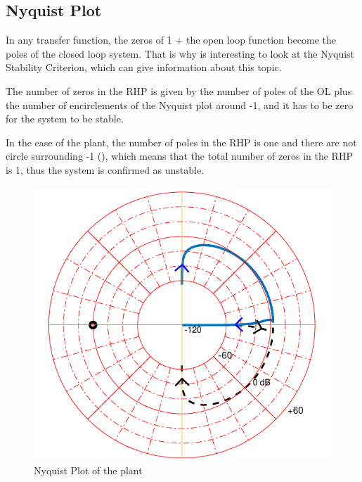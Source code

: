 \subsection{Nyquist Plot}
In any transfer function, the zeros of 1 + the open loop function become the poles of the closed loop system. That is why is interesting to look at the Nyquist Stability Criterion, which can give information about this topic.

The number of zeros in the RHP is given by the number of poles of the OL plus the number of encirclements of the Nyquist plot around -1, and it has to be zero for the system to be stable.

In the case of the plant, the number of poles in the RHP is one and there are not circle surrounding -1 (), which means that the total number of zeros in the RHP is 1, thus the system is confirmed as unstable.

\begin{figure}[H] 
	\centering 
	\includegraphics[scale=0.4]{figures/nyquistCubli}
	\centering
	\captionsetup{justification=centering}	
	\caption{Nyquist Plot of the plant}
	\label{nyquistCubli}
\end{figure}
